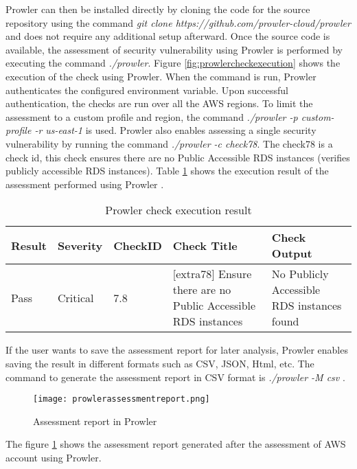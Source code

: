 Prowler can then be installed directly by cloning the
code for the source repository \cite{48} using the
command \textit{git clone https://github.com/prowler-cloud/prowler} and does not require any additional setup afterward.
Once the source code is available, the assessment of security vulnerability using Prowler is performed by executing the command \textit{./prowler}.
Figure \ref{fig:prowlercheckexecution} shows the execution of the check using Prowler.
When the command is run, Prowler authenticates the configured environment variable.
Upon successful authentication, the checks are run over all the AWS regions.
To limit the assessment to a custom profile and region, the command \textit{./prowler -p custom-profile -r us-east-1} is used.
Prowler also enables assessing a single security vulnerability by running the command \textit{./prowler -c check78}.
The check78 is a check id, this check ensures there are no Public Accessible RDS instances (verifies publicly accessible RDS instances).
Table \ref{tab:prowlerextra} shows the execution result
of the assessment performed using Prowler \cite{48}.
\begin{table}[h!]
    \begin{center}
        \caption{Prowler check execution result}
        \label{tab:prowlerextra}
        \begin{tabular}{|p{1.4cm}|p{1.7cm}|p{1.5cm}|p{4.0cm}|p{5.0cm}|}
            \hline
            \textbf{Result} & \textbf{Severity} & \textbf{CheckID} & \textbf{Check Title} & \textbf{Check Output}\\
            \hline
            Pass & Critical & 7.8 & [extra78] Ensure there are no Public Accessible RDS instances &
            No Publicly Accessible RDS instances found\\
            \hline
        \end{tabular}
    \end{center}
\end{table}

\par If the user wants to save the assessment report for later analysis, Prowler enables saving the result in different formats such as CSV, JSON, Html, etc.
The command to generate the assessment report in CSV
format is
\textit{./prowler
-M csv} \cite{49}.

\begin{figure}
    \centering
    \texttt{[image: prowlerassessmentreport.png]}
    \caption{Assessment report in Prowler}
    \label{fig:assessmentreport}
\end{figure}

The figure \ref{fig:assessmentreport} shows the
assessment report generated after the assessment of AWS
account using Prowler.